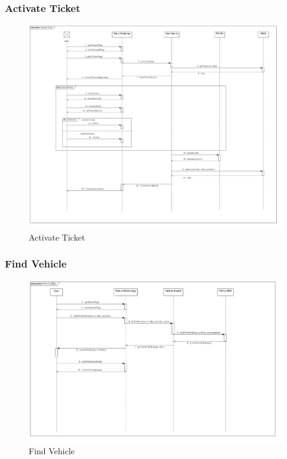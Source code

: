 \documentclass{article}
\begin{document}
				\subsubsection{Activate Ticket}
				\begin{figure}[H]
				\includegraphics[width=\linewidth]{Images/Sequence_Diagrams/6-Activate_Ticket_DD.jpg}
				\caption{Activate Ticket}
				\label{fig:SD6}
				\end{figure}
				\subsubsection{Find Vehicle}
				\begin{figure}[H]
				\includegraphics[width=\linewidth]{Images/Sequence_Diagrams/7-Find_Car_Bike_DD.jpg}
				\caption{Find Vehicle}
				\label{fig:SD7}
				\end{figure}
\end{document}
